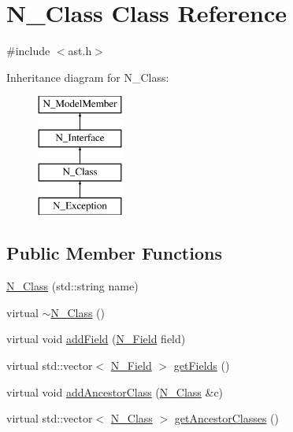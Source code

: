 \hypertarget{classN__Class}{}\section{N\+\_\+\+Class Class Reference}
\label{classN__Class}


{\ttfamily \#include $<$ast.\+h$>$}

Inheritance diagram for N\+\_\+\+Class\+:\begin{figure}[H]
\begin{center}
\leavevmode
\includegraphics[height=4.000000cm]{classN__Class}
\end{center}
\end{figure}
\subsection*{Public Member Functions}
\begin{DoxyCompactItemize}
\item 
\hyperlink{classN__Class_a3f3a1254f6370fcee748a50e460b0da4}{N\+\_\+\+Class} (std\+::string name)
\item 
virtual \hyperlink{classN__Class_a141071f7db3aba8a98af0e67d711d046}{$\sim$\+N\+\_\+\+Class} ()
\item 
virtual void \hyperlink{classN__Class_ae6be664192857da779ff575019321304}{add\+Field} (\hyperlink{classN__Field}{N\+\_\+\+Field} field)
\item 
virtual std\+::vector$<$ \hyperlink{classN__Field}{N\+\_\+\+Field} $>$ \hyperlink{classN__Class_a5caf6d52ac2fd564e1fa1c4a6b4e00f8}{get\+Fields} ()
\item 
virtual void \hyperlink{classN__Class_a2f6d7f3cbe120e4b38520fb1c95e4f42}{add\+Ancestor\+Class} (\hyperlink{classN__Class}{N\+\_\+\+Class} \&c)
\item 
virtual std\+::vector$<$ \hyperlink{classN__Class}{N\+\_\+\+Class} $>$ \hyperlink{classN__Class_aa27ad0ec290cf7dea9a479524e4b0192}{get\+Ancestor\+Classes} ()
\end{DoxyCompactItemize}
